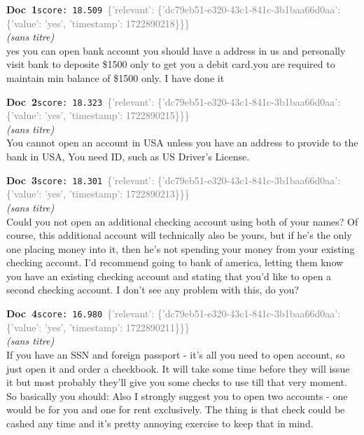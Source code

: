 \documentclass[a4paper,11pt]{article}
\begin{document}
\begin{docenv}
{\footnotesize\textcolor{doccolor}{\textbf{Doc~1}}}\hfill{\tiny\texttt{score:~18.509}}\ {\tiny\textcolor{gray}{\{'relevant': \{'dc79eb51-e320-43c1-841c-3b1baa66d0aa': \{'value': 'yes', 'timestamp': 1722890218\}\}\}}}\\[3pt]
{\small\textit{(sans titre)}}\\[2pt]
\vspace{2pt}
{\footnotesize 
yes you can open bank account you should have a address in us and personally visit bank to deposite \$1500 only to get you a debit card.you are required to maintain min balance of \$1500 only. I have done it}
\end{docenv}
\begin{docenv}
{\footnotesize\textcolor{doccolor}{\textbf{Doc~2}}}\hfill{\tiny\texttt{score:~18.323}}\ {\tiny\textcolor{gray}{\{'relevant': \{'dc79eb51-e320-43c1-841c-3b1baa66d0aa': \{'value': 'yes', 'timestamp': 1722890215\}\}\}}}\\[3pt]
{\small\textit{(sans titre)}}\\[2pt]
\vspace{2pt}
{\footnotesize 
You cannot open an account in USA unless you have an address to provide to the bank in USA, You need ID, such as US Driver's License.}
\end{docenv}
\begin{docenv}
{\footnotesize\textcolor{doccolor}{\textbf{Doc~3}}}\hfill{\tiny\texttt{score:~18.301}}\ {\tiny\textcolor{gray}{\{'relevant': \{'dc79eb51-e320-43c1-841c-3b1baa66d0aa': \{'value': 'yes', 'timestamp': 1722890213\}\}\}}}\\[3pt]
{\small\textit{(sans titre)}}\\[2pt]
\vspace{2pt}
{\footnotesize 
Could you not open an additional checking account using both of your names? Of course, this additional account will technically also be yours, but if he's the only one placing money into it, then he's not spending your money from your existing checking account. I'd recommend going to bank of america, letting them know you have an existing checking account and stating that you'd like to open a second checking account.  I don't see any problem with this, do you?}
\end{docenv}
\begin{docenv}
{\footnotesize\textcolor{doccolor}{\textbf{Doc~4}}}\hfill{\tiny\texttt{score:~16.980}}\ {\tiny\textcolor{gray}{\{'relevant': \{'dc79eb51-e320-43c1-841c-3b1baa66d0aa': \{'value': 'yes', 'timestamp': 1722890211\}\}\}}}\\[3pt]
{\small\textit{(sans titre)}}\\[2pt]
\vspace{2pt}
{\footnotesize 
If you have an SSN and foreign passport - it's all you need to open account, so just open it and order a checkbook. It will take some time before they will issue it but most probably they'll give you some checks to use till that very moment.  So basically you should: Also I strongly suggest you to open two accounts - one would be for you and one for rent exclusively. The thing is that check could be cashed any time and it's pretty annoying exercise to keep that in mind.}
\end{docenv}
\end{document}
